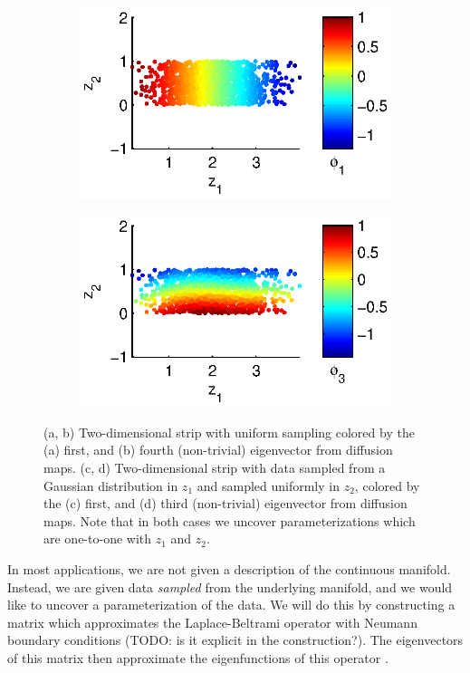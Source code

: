 \documentclass[preprint]{elsarticle}
\begin{document}
\begin{figure}[t]
\begin{subfigure}{0.45\textwidth}
\includegraphics[width=\textwidth]{strip_nonuniform1}
\caption{}
\end{subfigure}
%
\begin{subfigure}{0.45\textwidth}
\includegraphics[width=\textwidth]{strip_nonuniform2}
\caption{}
\end{subfigure}
\caption{(a, b) Two-dimensional strip with uniform sampling colored by the (a) first, and (b) fourth (non-trivial) eigenvector from diffusion maps. (c, d) Two-dimensional strip with data sampled from a Gaussian distribution in $z_1$ and sampled uniformly in $z_2$, colored by the (c) first, and (d) third (non-trivial) eigenvector from diffusion maps. Note that in both cases we uncover parameterizations which are one-to-one with $z_1$ and $z_2$. }
\label{fig:strip_evecs}
\end{figure}

In most applications, we are not given a description of the continuous manifold. 
%
Instead, we are given data {\em sampled} from the underlying manifold, and we would like to uncover a parameterization of the data.
%
We will do this by constructing a matrix which approximates the Laplace-Beltrami operator with Neumann boundary conditions (TODO: is it explicit in the construction?). 
%
The eigenvectors of this matrix then approximate the eigenfunctions of this operator \cite{...}.
\end{document}
